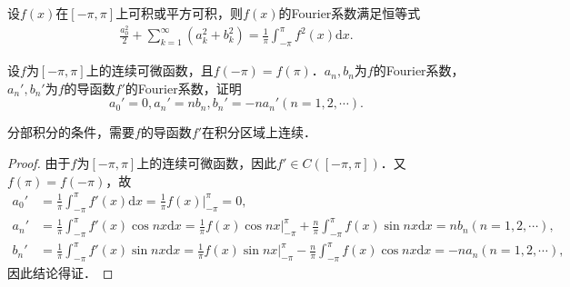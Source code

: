 \documentclass[../../main.tex]{subfiles}
\begin{document}
\begin{theorem}[Parseval恒等式]\label{theorem:Parseval恒等式}
设$f(x)$在$[-\pi,\pi]$上可积或平方可积，则$f(x)$的Fourier系数满足恒等式
\begin{align*}
\frac{a_0^2}{2}+\sum_{k = 1}^{\infty}(a_k^2 + b_k^2)=\frac{1}{\pi}\int_{-\pi}^{\pi}f^2(x)\mathrm{d}x.
\end{align*}
\end{theorem}

\begin{lemma}\label{lemma:Fourier级数与其导函数的系数关系}
设$f$为$[-\pi,\pi]$上的连续可微函数，且$f(-\pi)=f(\pi)$．$a_n,b_n$为$f$的Fourier系数，$a_{n}',b_{n}'$为$f$的导函数$f'$的Fourier系数，证明
$$a_{0}'=0,a_{n}'=nb_n,b_{n}'=-na_{n}'(n=1,2,\cdots).$$
\end{lemma}
\begin{remark}
分部积分的条件，需要$f$的导函数$f'$在积分区域上连续．
\end{remark}
\begin{proof}
由于$f$为$[-\pi,\pi]$上的连续可微函数，因此$f'\in C([-\pi,\pi])$．又$f(\pi)=f(-\pi)$，故
\begin{align*}
a_{0}'&=\frac{1}{\pi}\int_{-\pi}^{\pi}f'(x)\mathrm{d}x=\frac{1}{\pi}f(x)\Big|_{-\pi}^{\pi}=0,\\
a_{n}'&=\frac{1}{\pi}\int_{-\pi}^{\pi}f'(x)\cos nx\mathrm{d}x=\frac{1}{\pi}f(x)\cos nx\Big|_{-\pi}^{\pi}+\frac{n}{\pi}\int_{-\pi}^{\pi}f(x)\sin nx\mathrm{d}x=nb_n(n=1,2,\cdots),\\
b_{n}'&=\frac{1}{\pi}\int_{-\pi}^{\pi}f'(x)\sin nx\mathrm{d}x=\frac{1}{\pi}f(x)\sin nx\Big|_{-\pi}^{\pi}-\frac{n}{\pi}\int_{-\pi}^{\pi}f(x)\cos nx\mathrm{d}x=-na_n(n=1,2,\cdots),
\end{align*}
因此结论得证．
\end{proof}
\end{document}
